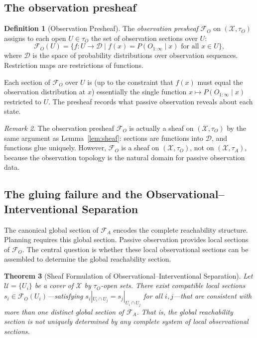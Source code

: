 \documentclass[11pt, a4paper]{article}
\theoremstyle{plain}
\newtheorem{theorem}{Theorem}[section]
\theoremstyle{definition}
\newtheorem{definition}[theorem]{Definition}
\theoremstyle{remark}
\newtheorem{remark}[theorem]{Remark}
\newcommand{\calX}{\mathcal{X}}
\newcommand{\calF}{\mathcal{F}}
\begin{document}
\subsection{The observation presheaf}

\begin{definition}[Observation Presheaf]
\label{def:obs_presheaf}
The \emph{observation presheaf} $\calF_O$ on $(\calX, \tau_O)$ assigns to
each open $U \in \tau_O$ the set of observation sections over $U$:
\[
  \calF_O(U) = \bigl\{ f\colon U \to \mathcal{D}
    \;\big|\; f(x) = P(O_{1:\infty} \mid x) \text{ for all } x \in U \bigr\},
\]
where $\mathcal{D}$ is the space of probability distributions over observation
sequences. Restriction maps are restrictions of functions.
\end{definition}

Each section of $\calF_O$ over $U$ is (up to the constraint that $f(x)$ must
equal the observation distribution at $x$) essentially the single function
$x \mapsto P(O_{1:\infty} \mid x)$ restricted to $U$. The presheaf records
what passive observation reveals about each state.

\begin{remark}
The observation presheaf $\calF_O$ is actually a sheaf on $(\calX, \tau_O)$
by the same argument as Lemma~\ref{lem:sheaf}: sections are functions into
$\mathcal{D}$, and functions glue uniquely. However, $\calF_O$ is a sheaf on
$(\calX, \tau_O)$, not on $(\calX, \tau_A)$, because the observation topology
is the natural domain for passive observation data.
\end{remark}

\subsection{The gluing failure and the Observational--Interventional Separation}

The canonical global section of $\calF_A$ encodes the complete reachability
structure. Planning requires this global section. Passive observation provides
local sections of $\calF_O$. The central question is whether these local
observational sections can be assembled to determine the global reachability
section.

\begin{theorem}[Sheaf Formulation of Observational--Interventional Separation]
\label{thm:sheaf_oist}
Let $\mathcal{U} = \{U_i\}$ be a cover of $\calX$ by $\tau_O$-open sets.
There exist compatible local sections $s_i \in \calF_O(U_i)$---satisfying
$s_i|_{U_i \cap U_j} = s_j|_{U_i \cap U_j}$ for all $i, j$---that are
consistent with more than one distinct global section of $\calF_A$. That is,
the global reachability section is not uniquely determined by any complete
system of local observational sections.
\end{theorem}
\end{document}

